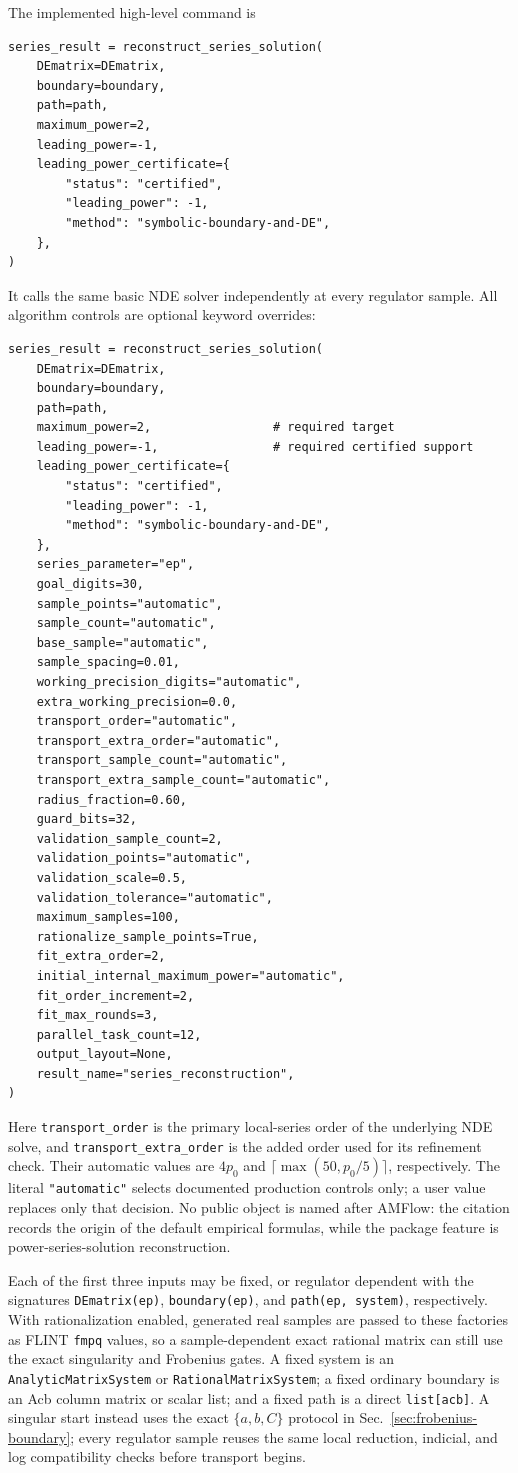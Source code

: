 \documentclass[11pt]{article}
\begin{document}
The implemented high-level command is
\begin{verbatim}
series_result = reconstruct_series_solution(
    DEmatrix=DEmatrix,
    boundary=boundary,
    path=path,
    maximum_power=2,
    leading_power=-1,
    leading_power_certificate={
        "status": "certified",
        "leading_power": -1,
        "method": "symbolic-boundary-and-DE",
    },
)
\end{verbatim}
It calls the same basic NDE solver independently at every regulator sample.  All algorithm
controls are optional keyword overrides:
\begin{verbatim}
series_result = reconstruct_series_solution(
    DEmatrix=DEmatrix,
    boundary=boundary,
    path=path,
    maximum_power=2,                 # required target
    leading_power=-1,                # required certified support
    leading_power_certificate={
        "status": "certified",
        "leading_power": -1,
        "method": "symbolic-boundary-and-DE",
    },
    series_parameter="ep",
    goal_digits=30,
    sample_points="automatic",
    sample_count="automatic",
    base_sample="automatic",
    sample_spacing=0.01,
    working_precision_digits="automatic",
    extra_working_precision=0.0,
    transport_order="automatic",
    transport_extra_order="automatic",
    transport_sample_count="automatic",
    transport_extra_sample_count="automatic",
    radius_fraction=0.60,
    guard_bits=32,
    validation_sample_count=2,
    validation_points="automatic",
    validation_scale=0.5,
    validation_tolerance="automatic",
    maximum_samples=100,
    rationalize_sample_points=True,
    fit_extra_order=2,
    initial_internal_maximum_power="automatic",
    fit_order_increment=2,
    fit_max_rounds=3,
    parallel_task_count=12,
    output_layout=None,
    result_name="series_reconstruction",
)
\end{verbatim}
Here \texttt{transport\_order} is the primary local-series order of the underlying NDE solve,
and \texttt{transport\_extra\_order} is the added order used for its refinement check.  Their
automatic values are $4p_0$ and $\lceil\max(50,p_0/5)\rceil$, respectively.  The literal
\texttt{"automatic"} selects documented production controls only; a user value replaces
only that decision.  No public object is named after AMFlow: the citation records the origin
of the default empirical formulas, while the package feature is power-series-solution
reconstruction.

Each of the first three inputs may be fixed, or regulator dependent with the signatures
\texttt{DEmatrix(ep)}, \texttt{boundary(ep)}, and \texttt{path(ep, system)}, respectively.
With rationalization enabled, generated real samples are passed to these factories as FLINT
\texttt{fmpq} values, so a sample-dependent exact rational matrix can still use the exact
singularity and Frobenius gates.  A fixed system is an \texttt{AnalyticMatrixSystem} or
\texttt{RationalMatrixSystem}; a fixed ordinary boundary is an Acb column matrix or scalar
list; and a fixed path is a direct \texttt{list[acb]}.  A singular start instead uses the
exact $\{a,b,C\}$ protocol in Sec.~\ref{sec:frobenius-boundary}; every regulator sample
reuses the same local reduction, indicial, and log compatibility checks before transport
begins.
\end{document}
